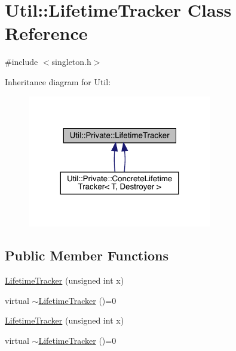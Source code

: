 \hypertarget{classUtil_1_1Private_1_1LifetimeTracker}{}\section{Util\+:\+:Lifetime\+Tracker Class Reference}
\label{classUtil_1_1Private_1_1LifetimeTracker}


{\ttfamily \#include $<$singleton.\+h$>$}



Inheritance diagram for Util\+:\nopagebreak
\begin{figure}[H]
\begin{center}
\leavevmode
\includegraphics[width=228pt]{d1/d15/classUtil_1_1Private_1_1LifetimeTracker__inherit__graph}
\end{center}
\end{figure}
\subsection*{Public Member Functions}
\begin{DoxyCompactItemize}
\item 
\mbox{\hyperlink{classUtil_1_1Private_1_1LifetimeTracker_adfc292ac14a2b71f88059accf8925772}{Lifetime\+Tracker}} (unsigned int x)
\item 
virtual \mbox{\hyperlink{classUtil_1_1Private_1_1LifetimeTracker_aa4c2c67352679440491759ed6fd0a7e4}{$\sim$\+Lifetime\+Tracker}} ()=0
\item 
\mbox{\hyperlink{classUtil_1_1Private_1_1LifetimeTracker_adfc292ac14a2b71f88059accf8925772}{Lifetime\+Tracker}} (unsigned int x)
\item 
virtual \mbox{\hyperlink{classUtil_1_1Private_1_1LifetimeTracker_a97bbcdce3400b78bd3d1a62f9760d6ab}{$\sim$\+Lifetime\+Tracker}} ()=0
\end{DoxyCompactItemize}
